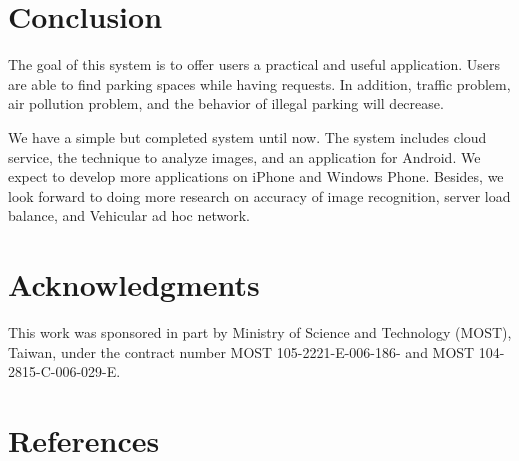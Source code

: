 \documentclass[preprint,12pt]{elsarticle}
\begin{document}
\section{Conclusion}\label{sec:conclusion}

The goal of this system is to offer users a practical and useful
application. Users are able to find parking spaces while having
requests. In addition, traffic problem, air pollution problem, and the
behavior of illegal parking will decrease.

We have a simple but completed system until now. The system includes
cloud service, the technique to analyze images, and an application for
Android. We expect to develop more applications on iPhone and Windows
Phone. Besides, we look forward to doing more research on accuracy of
image recognition, server load balance, and Vehicular ad hoc network.

\section*{Acknowledgments}\label{sec:ack}

This work was sponsored in part by Ministry of Science and Technology
(MOST), Taiwan, under the contract number MOST 105-2221-E-006-186- and
MOST 104-2815-C-006-029-E.





\section*{References}



\end{document}
